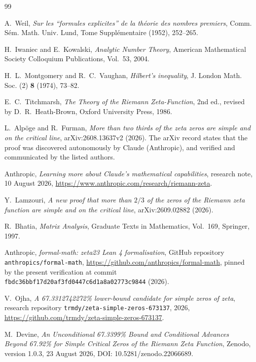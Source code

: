 \documentclass[11pt]{article}
\begin{document}
\begin{thebibliography}{99}

A.~Weil,
\emph{Sur les ``formules explicites'' de la th\'eorie des nombres premiers},
Comm. S\'em. Math. Univ. Lund, Tome Suppl\'ementaire (1952), 252--265.

H.~Iwaniec and E.~Kowalski,
\emph{Analytic Number Theory},
American Mathematical Society Colloquium Publications, Vol.~53, 2004.

H.~L.~Montgomery and R.~C.~Vaughan,
\emph{Hilbert's inequality},
J. London Math. Soc. (2) \textbf{8} (1974), 73--82.

E.~C.~Titchmarsh,
\emph{The Theory of the Riemann Zeta-Function},
2nd ed., revised by D.~R.~Heath-Brown,
Oxford University Press, 1986.



L.~Alpöge and R.~Furman,
\emph{More than two thirds of the zeta zeros are simple and on the critical
line},
arXiv:2608.13637v2 (2026).
The arXiv record states that the proof was discovered autonomously by Claude
(Anthropic), and verified and communicated by the listed authors.

Anthropic,
\emph{Learning more about Claude's mathematical capabilities},
research note, 10 August 2026,
\url{https://www.anthropic.com/research/riemann-zeta}.

Y.~Lamzouri,
\emph{A new proof that more than $2/3$ of the zeros of the Riemann zeta
function are simple and on the critical line},
arXiv:2609.02882 (2026).

R.~Bhatia,
\emph{Matrix Analysis},
Graduate Texts in Mathematics, Vol.~169, Springer, 1997.

Anthropic,
\emph{formal-math: zeta23 Lean 4 formalisation},
GitHub repository \texttt{anthropics/formal-math},
\url{https://github.com/anthropics/formal-math},
pinned by the present verification at commit
\texttt{fbdc36bbf17d20af3fd0447c6d1a8a02773c9844} (2026).

V.~Ojha,
\emph{A 67.3312742272\% lower-bound candidate for simple zeros of zeta},
research repository \texttt{trmdy/zeta-simple-zeros-673137}, 2026,
\url{https://github.com/trmdy/zeta-simple-zeros-673137}.

M.~Devine,
\emph{An Unconditional 67.3399\% Bound and Conditional Advances Beyond
67.92\% for Simple Critical Zeros of the Riemann Zeta Function},
Zenodo, version 1.0.3, 23 August 2026,
DOI: 10.5281/zenodo.22066689.


\end{thebibliography}
\end{document}
